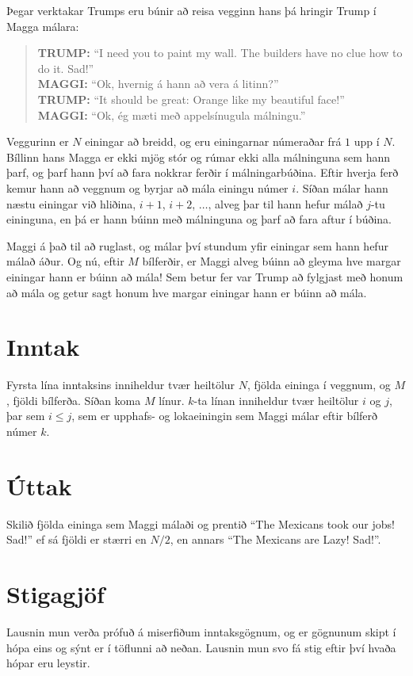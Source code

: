 
\noindent
Þegar verktakar Trumps eru búnir að reisa vegginn hans þá hringir
Trump í Magga málara:

\begin{quote}
\textbf{TRUMP:} ``I need you to paint my wall. The builders have no clue how to do it. Sad!''\\
\textbf{MAGGI:} ``Ok, hvernig á hann að vera á litinn?''\\
\textbf{TRUMP:} ``It should be great: Orange like my beautiful face!''\\
\textbf{MAGGI:} ``Ok, ég mæti með appelsínugula málningu.''
\end{quote}

\noindent
Veggurinn er $N$ einingar að breidd, og eru einingarnar númeraðar frá $1$ upp í
$N$.
Bíllinn hans Magga er ekki mjög stór og rúmar ekki alla málninguna sem hann
þarf, og þarf hann því að fara nokkrar ferðir í málningarbúðina. Eftir hverja ferð kemur hann að veggnum 
og byrjar að mála einingu númer $i$. Síðan málar hann næstu einingar við hliðina, $i+1$, $i+2$,
$\ldots$, alveg þar til hann hefur málað $j$-tu eininguna, en þá er hann búinn með málninguna
og þarf að fara aftur í búðina.

Maggi á það til að ruglast, og málar því stundum yfir einingar sem hann
hefur málað áður. Og nú, eftir $M$ bílferðir, er Maggi alveg búinn að gleyma
hve margar einingar hann er búinn að mála! Sem betur fer var Trump að fylgjast
með honum að mála og getur sagt honum hve margar einingar hann er búinn að
mála.

\section*{Inntak}
Fyrsta lína inntaksins inniheldur tvær heiltölur $N$, fjölda eininga í veggnum,
og $M$, fjöldi bílferða. Síðan koma $M$ línur. $k$-ta línan inniheldur tvær
heiltölur $i$ og $j$, þar sem $i \le j$, sem er upphafs- og lokaeiningin sem
Maggi málar eftir bílferð númer $k$.

\section*{Úttak}
Skilið fjölda eininga sem Maggi málaði og prentið ``The Mexicans took our jobs! Sad!'' ef sá fjöldi er stærri en $N / 2$, en annars ``The Mexicans are Lazy! Sad!''.

\section*{Stigagjöf}
Lausnin mun verða prófuð á miserfiðum inntaksgögnum, og er gögnunum skipt í
hópa eins og sýnt er í töflunni að neðan. Lausnin mun svo fá stig eftir því
hvaða hópar eru leystir.

